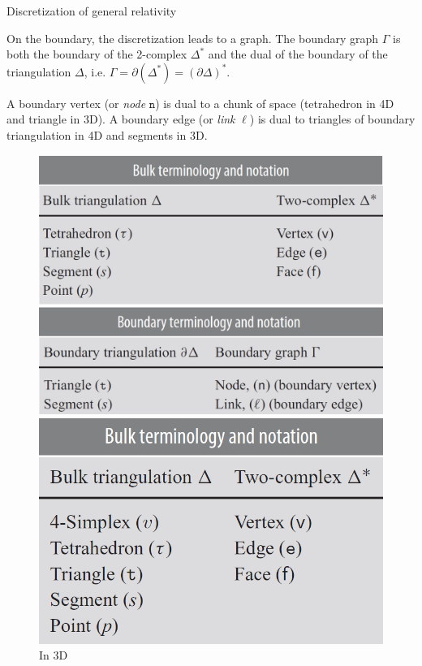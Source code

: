 \documentclass[12pt,titlepage]{article}
\begin{document}
\begin{frame}{Discretization of general relativity}
    \begin{list}{\,}{\leftmargin=1em \itemindent=0em}
        \item<1-> On the boundary, the discretization leads to a graph. The boundary graph $\Gamma$ is both the boundary of the 2-complex $\Delta^\text{*}$ and the dual of the boundary of the triangulation $\Delta$, i.e. $\Gamma=\partial\left(\Delta^\text{*}\right)=\left(\partial\Delta\right)^\text{*}$.
        \item<2-> A boundary vertex (or \textit{node} $\mathtt{n}$) is dual to a chunk of space (tetrahedron in 4D and triangle in 3D). A boundary edge (or \textit{link} $\ell$) is dual to triangles of boundary triangulation in 4D and segments in 3D.\FloatBarrier
        \begin{figure}[!ht]
            \begin{minipage}{0.56375\linewidth}
                \includegraphics[width=\linewidth]{4.7}
                \caption{In 3D}
            \end{minipage}
            \begin{minipage}{0.43625\linewidth}
                \includegraphics[width=\linewidth]{4.8}

\end{minipage}
\end{figure}
\end{list}
\end{frame}
\end{document}
